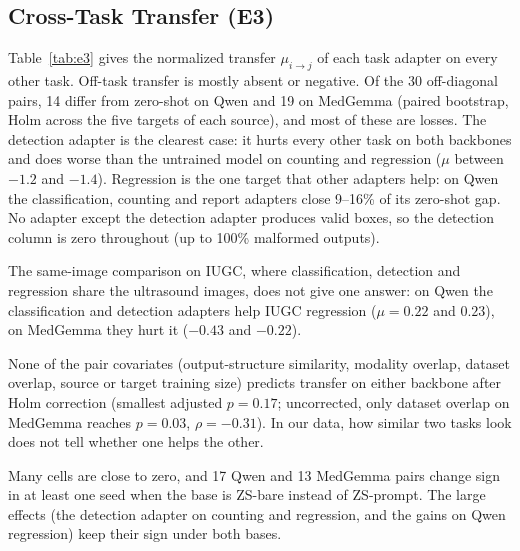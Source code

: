 \documentclass[journal,twoside,web]{ieeecolor}
\begin{document}
\subsection{Cross-Task Transfer (E3)}
Table~\ref{tab:e3} gives the normalized transfer $\mu_{i\to j}$ of each task
adapter on every other task. Off-task transfer is mostly absent or negative.
Of the 30 off-diagonal pairs, 14 differ from zero-shot on Qwen and 19 on
MedGemma (paired bootstrap, Holm across the five targets of each source),
and most of these are losses. The detection adapter is the clearest case: it
hurts every other task on both backbones and does worse than the untrained
model on counting and regression ($\mu$ between $-1.2$ and $-1.4$).
Regression is the one target that other adapters help: on Qwen the
classification, counting and report adapters close 9--16\% of its zero-shot
gap. No adapter except the detection adapter produces valid boxes, so the
detection column is zero throughout (up to 100\% malformed outputs).

The same-image comparison on IUGC, where classification, detection and
regression share the ultrasound images, does not give one answer: on Qwen
the classification and detection adapters help IUGC regression ($\mu=0.22$
and $0.23$), on MedGemma they hurt it ($-0.43$ and $-0.22$).

None of the pair covariates (output-structure similarity, modality overlap,
dataset overlap, source or target training size) predicts transfer on either
backbone after Holm correction (smallest adjusted $p=0.17$; uncorrected, only
dataset overlap on MedGemma reaches $p=0.03$, $\rho=-0.31$). In our data,
how similar two tasks look does not tell whether one helps the other.

Many cells are close to zero, and 17 Qwen and 13 MedGemma pairs change sign
in at least one seed when the base is ZS-bare instead of ZS-prompt. The large
effects (the detection adapter on counting and regression, and the gains on
Qwen regression) keep their sign under both bases.
\end{document}
